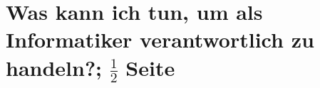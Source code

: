 \documentclass[a4paper, 11pt]{scrartcl}
\begin{document}
\newpage



\section{Was kann ich tun, um als Informatiker verantwortlich zu handeln?; $\frac{1}{2}$ Seite}

\newpage

\printbibliography














% 

% 
\end{document}
